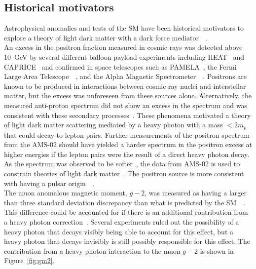 \subsection{Historical motivators}
Astrophysical anomalies and tests of the SM have been historical motivators to explore a theory of light dark matter with a dark force mediator~\cite{cheung_kinetic_2009}~\cite{andreas_dark_2013}. \\
\indent An excess in the positron fraction measured in cosmic rays was detected above 10~GeV by several different balloon payload experiments including HEAT~\cite{Barwick:1995gv} and CAPRICE~\cite{Boezio:2001dtm} and confirmed in space telescopes such as PAMELA~\cite{adriani_observation_2009}, the Fermi Large Area Telescope~\cite{Abdollahi:2017nat}~\cite{the_fermi_lat_collaboration_measurement_2012}, and the Alpha Magnetic Spectrometer~\cite{Schael:2007tta}~\cite{ams_collaboration_first_2013}. Positrons are known to be produced in interactions between cosmic ray nuclei and interstellar matter, but the excess was unforeseen from these sources alone. Alternatively, the measured anti-proton spectrum did not show an excess in the spectrum and was consistent with these secondary processes~\cite{cholis_high_2009}. These phenomena motivated a theory of light dark matter scattering mediated by a heavy photon with a mass $<2m_p$ that could decay to lepton pairs. Further measurements of the positron spectrum from the AMS-02 should have yielded a harder spectrum in the positron excess at higher energies if the lepton pairs were the result of a direct heavy photon decay. As the spectrum was observed to be softer~\cite{Bergstrom:2013jra}, the data from AMS-02 is used to constrain theories of light dark matter~\cite{liu_signals_2015}. The positron source is more consistent with having a pulsar origin~\cite{cholis_dark_2013}~\cite{Yin:2013vaa}. \\
\indent The muon anomalous magnetic moment, $g-2$, was measured as having a larger than three standard deviation discrepancy than what is predicted by the SM~\cite{blum_muon_2013}~\cite{muon_final_2006}. This difference could be accounted for if there is an additional contribution from a heavy photon correction~\cite{pospelov_secluded_2009}. Several experiments ruled out the possibility of a heavy photon that decays visibly being able to account for this effect, but a heavy photon that decays invisibly is still possibly responsible for this effect. The contribution from a heavy photon interaction to the muon $g-2$ is shown in Figure~\ref{fig:gm2}.

